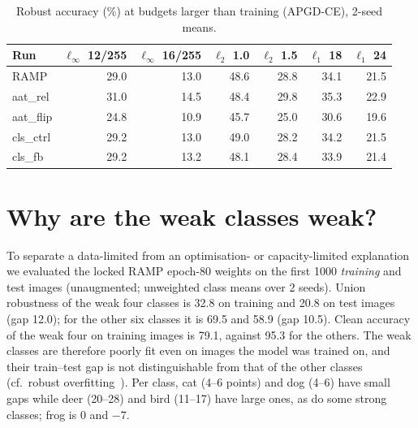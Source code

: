 \documentclass[11pt]{article}
\begin{document}
\begin{table}[h]\centering\caption{Robust accuracy (\%) at budgets larger than training (APGD-CE), 2-seed means.}\label{tab:unseen}
\begin{tabular}{lrrrrrr}\toprule
Run & $\ell_\infty$ 12/255 & $\ell_\infty$ 16/255 & $\ell_2$ 1.0 & $\ell_2$ 1.5 & $\ell_1$ 18 & $\ell_1$ 24 \\\midrule
RAMP & 29.0 & 13.0 & 48.6 & 28.8 & 34.1 & 21.5 \\
aat\_rel & 31.0 & 14.5 & 48.4 & 29.8 & 35.3 & 22.9 \\
aat\_flip & 24.8 & 10.9 & 45.7 & 25.0 & 30.6 & 19.6 \\
cls\_ctrl & 29.2 & 13.0 & 49.0 & 28.2 & 34.2 & 21.5 \\
cls\_fb & 29.2 & 13.2 & 48.1 & 28.4 & 33.9 & 21.4 \\
\bottomrule\end{tabular}

\end{table}

\section{Why are the weak classes weak?}
To separate a data-limited from an optimisation- or capacity-limited explanation we evaluated the locked RAMP epoch-80 weights on the
first 1000 \emph{training} and test images (unaugmented; unweighted class means over 2 seeds). Union robustness of the weak four classes is
32.8 on training and 20.8 on test images (gap 12.0); for the other six classes it is 69.5 and 58.9 (gap 10.5). Clean accuracy of the weak
four on training images is 79.1, against 95.3 for the others. The weak classes are therefore poorly fit even on images the model was trained
on, and their train--test gap is not distinguishable from that of the other classes (cf.\ robust overfitting~\cite{rice}). Per class, cat (4--6
points) and dog (4--6) have small gaps while deer (20--28) and bird (11--17) have large ones, as do some strong classes; frog is 0 and $-7$.
\end{document}
